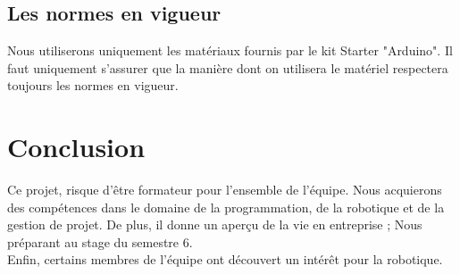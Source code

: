 \documentclass[conference]{IEEEtran}
\begin{document}
\subsection{Les normes en vigueur}
Nous utiliserons uniquement les matériaux fournis par le kit Starter "Arduino". Il faut uniquement s'assurer que la manière dont on utilisera le matériel respectera toujours les normes en vigueur.

\section{Conclusion}
Ce projet, risque d'être formateur pour l'ensemble de l'équipe. Nous acquierons des compétences dans le domaine de la programmation, de la robotique et de la gestion de projet. De plus, il donne un aperçu de la vie en entreprise ; Nous préparant au stage du semestre 6.\\
	Enfin, certains membres de l'équipe ont découvert un intérêt pour la robotique. 
\end{document}

